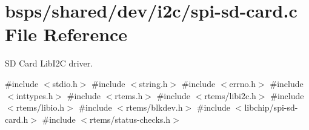 \hypertarget{spi-sd-card_8c}{}\section{bsps/shared/dev/i2c/spi-\/sd-\/card.c File Reference}
\label{spi-sd-card_8c}


SD Card Lib\+I2C driver.  


{\ttfamily \#include $<$stdio.\+h$>$}\newline
{\ttfamily \#include $<$string.\+h$>$}\newline
{\ttfamily \#include $<$errno.\+h$>$}\newline
{\ttfamily \#include $<$inttypes.\+h$>$}\newline
{\ttfamily \#include $<$rtems.\+h$>$}\newline
{\ttfamily \#include $<$rtems/libi2c.\+h$>$}\newline
{\ttfamily \#include $<$rtems/libio.\+h$>$}\newline
{\ttfamily \#include $<$rtems/blkdev.\+h$>$}\newline
{\ttfamily \#include $<$libchip/spi-\/sd-\/card.\+h$>$}\newline
{\ttfamily \#include $<$rtems/status-\/checks.\+h$>$}\newline
